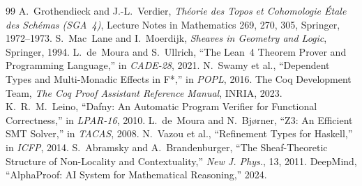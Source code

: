 \documentclass[11pt]{article}
\begin{document}

\begin{thebibliography}{99}
 A.~Grothendieck and J.-L.~Verdier, \emph{Th\'eorie des Topos et Cohomologie \'Etale des Sch\'emas (SGA~4)}, Lecture Notes in Mathematics 269, 270, 305, Springer, 1972--1973.
 S.~Mac~Lane and I.~Moerdijk, \emph{Sheaves in Geometry and Logic}, Springer, 1994.
 L.~de~Moura and S.~Ullrich, ``The Lean~4 Theorem Prover and Programming Language,'' in \emph{CADE-28}, 2021.
 N.~Swamy et al., ``Dependent Types and Multi-Monadic Effects in {F*},'' in \emph{POPL}, 2016.
 The Coq Development Team, \emph{The Coq Proof Assistant Reference Manual}, INRIA, 2023.
 K.~R.~M.~Leino, ``Dafny: An Automatic Program Verifier for Functional Correctness,'' in \emph{LPAR-16}, 2010.
 L.~de~Moura and N.~Bj\o{}rner, ``Z3: An Efficient SMT Solver,'' in \emph{TACAS}, 2008.
 N.~Vazou et al., ``Refinement Types for Haskell,'' in \emph{ICFP}, 2014.
 S.~Abramsky and A.~Brandenburger, ``The Sheaf-Theoretic Structure of Non-Locality and Contextuality,'' \emph{New J. Phys.}, 13, 2011.
 DeepMind, ``AlphaProof: AI System for Mathematical Reasoning,'' 2024.
\end{thebibliography}
\end{document}
